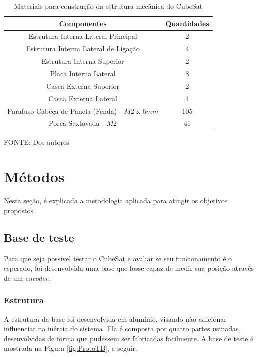 \documentclass[
	12pt,				%
	openany,			%
	twoside,			%
	a4paper,			%
	english,			%
	french,				%
	spanish,			%
	brazil,				%
	oldfontcommands
	]{abntex2}
\begin{document}
\begin{table}[h]
	\caption{Materiais para construção da estrutura mecânica do CubeSat}
		\centering
	\begin{tabular}{|c|c|}
		\hline
		\textbf{Componentes} & \textbf{Quantidades} \\ 
		\hline 
		Estrutura Interna Lateral Principal & 2 \\ 
		\hline 
		Estrutura Interna Lateral de Ligação & 4 \\ 
		\hline 
		Estrutura Interna Superior & 2 \\
		\hline 
		Placa Interna Lateral & 8 \\
		\hline 
		Casca Externa Superior & 2 \\ 
		\hline 
		Casca Externa Lateral & 4 \\ 
		\hline 
		Parafuso Cabeça de Panela (Fenda) - $M2$ x $6mm$ & 105 \\
		\hline
		Porca Sextavada - $M2$ & 41 \\
		\hline
	\end{tabular}
	
	\begin{small}
	\vspace{3pt}	
	FONTE: Dos autores
	\end{small}
	\label{tab:MatMec}
\end{table}

\section[Métodos]{Métodos}

Nesta seção, é explicada a metodologia aplicada para atingir os objetivos propostos.

\subsection{Base de teste}

Para que seja possível testar o CubeSat e avaliar se seu funcionamento é o esperado, foi desenvolvida uma base que fosse capaz de medir sua posição através de um \textit{encoder}.

\subsubsection{Estrutura}

A estrutura da base foi desenvolvida em alumínio, visando não adicionar influenciar na inércia do sistema. Ela é composta por quatro partes usinadas, desenvolvidas de forma que pudessem ser fabricadas facilmente. A base de teste é mostrada na Figura \ref{fig:ProtoTB}, a seguir.
\end{document}
